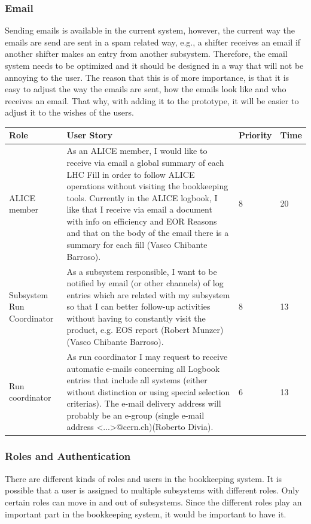 \documentclass[paper=a4, fontsize=11pt,twoside]{scrartcl}	%
\begin{document}
\subsubsection{Email}
Sending emails is available in the current system, however, the current way the emails are send are sent in a spam related way, e.g., a shifter receives an email if another shifter makes an entry from another subsystem. Therefore, the email system needs to be optimized and it should be designed in a way that will not be annoying to the user. The reason that this is of more importance, is that it is easy to adjust the way the emails are sent, how the emails look like and who receives an email. That why, with adding it to the prototype, it will be easier to adjust it to the wishes of the users.
\begin{longtable}{ | p{3cm} | p{8cm} | p{1cm} | l |}
\hline
Role & User Story & Priority & Time \\ \hline
ALICE member & As an ALICE member, I would like to receive via email a global summary of each LHC Fill in order to follow ALICE operations without visiting the bookkeeping tools. Currently in the ALICE logbook, I like that I receive via email a document with info on efficiency and EOR Reasons and that on the body of the email there is a summary for
each fill (Vasco Chibante Barroso). & 8 & 20 \\ \hline
Subsystem Run Coordinator &  As a subsystem responsible, I want to be notified by email (or other
channels) of log entries which are related with my subsystem so that I can better follow-up activities without having to constantly visit the product, e.g. EOS report (Robert Munzer) (Vasco Chibante Barroso). & 8 & 13 \\ \hline
Run coordinator & As run coordinator I may request to receive automatic e-mails concerning all Logbook entries that include all systems (either without distinction or using special selection criterias). The e-mail delivery address will probably be an e-group (single e-mail address <...>@cern.ch)(Roberto Divia). & 6 & 13 \\ \hline
\end{longtable}

\subsubsection{Roles and Authentication}
There are different kinds of roles and users in the bookkeeping system. It is possible that a user is assigned to multiple subsystems with different roles. Only certain roles can move in and out of subsystems. Since the different roles play an important part in the bookkeeping system, it  would be important to have it.
\end{document}
